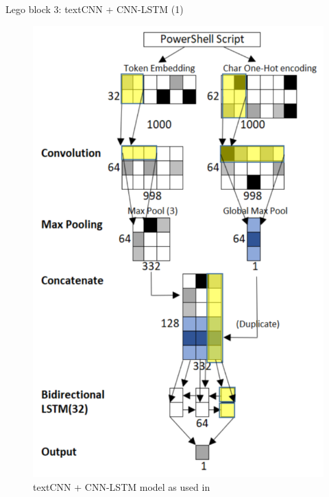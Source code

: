 \documentclass[10pt]{beamer}
\begin{document}
\begin{frame}{Lego block 3: textCNN + CNN-LSTM (1)}
	\begin{figure}
		\includegraphics[scale=0.20]{inlineEnsemble}
		\caption{textCNN + CNN-LSTM model as used in \cite{amsi2019}}
	\end{figure}
\end{frame}
\end{document}
